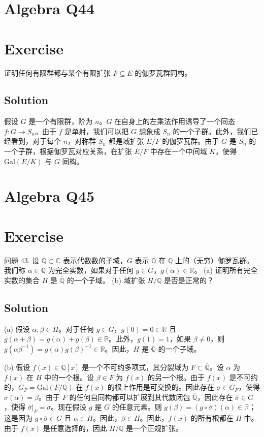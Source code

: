\documentclass[12pt]{book}
\begin{document}
\section{Algebra Q44}
\section*{Exercise}
证明任何有限群都与某个有限扩张 $F \subseteq E$ 的伽罗瓦群同构。



\subsection*{Solution}
假设 $G$ 是一个有限群，阶为 $n$。$G$ 在自身上的左乘法作用诱导了一个同态 $f: G \to S_n$。由于 $f$ 是单射，我们可以把 $G$ 想象成 $S_n$ 的一个子群。此外，我们已经看到，对于每个 $n$，对称群 $S_n$ 都是域扩张 $E/F$ 的伽罗瓦群。由于 $G$ 是 $S_n$ 的一个子群，根据伽罗瓦对应关系，在扩张 $E/F$ 中存在一个中间域 $K$，使得 $\text{Gal}(E/K)$ 与 $G$ 同构。
\newpage
\section{Algebra Q45}
\section*{Exercise}
问题 43. 设 $\overline{\mathbb{Q}} \subset \mathbb{C}$ 表示代数数的子域，$G$ 表示 $\overline{\mathbb{Q}}$ 在 $\mathbb{Q}$ 上的（无穷）伽罗瓦群。我们称 $\alpha \in \overline{\mathbb{Q}}$ 为完全实数，如果对于任何 $g \in G$，$g(\alpha) \in \mathbb{R}$。
(a) 证明所有完全实数的集合 $H$ 是 $\overline{\mathbb{Q}}$ 的一个子域。
(b) 域扩张 $H/\mathbb{Q}$ 是否是正常的？



\subsection*{Solution}
(a) 假设 $\alpha, \beta \in H$。对于任何 $g \in G$，$g(0) = 0 \in \mathbb{R}$ 且 $g(\alpha + \beta) = g(\alpha) + g(\beta) \in \mathbb{R}$。此外，$g(1) = 1$，如果 $\beta \neq 0$，则 $g(\alpha\beta^{-1}) = g(\alpha)g(\beta)^{-1} \in \mathbb{R}$。因此，$H$ 是 $\overline{\mathbb{Q}}$ 的一个子域。

(b) 假设 $f(x) \in \mathbb{Q}[x]$ 是一个不可约多项式，其分裂域为 $F \subset \overline{\mathbb{Q}}$。设 $\alpha$ 为 $f(x)$ 在 $H$ 中的一个根。设 $\beta \in F$ 为 $f(x)$ 的另一个根。由于 $f(x)$ 是不可约的，$G_F = \text{Gal}(F/\mathbb{Q})$ 在 $f(x)$ 的根上作用是可交换的。因此存在 $\sigma \in G_F$，使得 $\sigma(\alpha) = \beta$。由于 $F$ 的任何自同构都可以扩展到其代数闭包 $\overline{\mathbb{Q}}$，因此存在 $\overline{\sigma} \in G$，使得 $\overline{\sigma}|_F = \sigma$。现在假设 $g$ 是 $G$ 的任意元素。则 $g(\beta) = (g \circ \overline{\sigma})(\alpha) \in \mathbb{R}$；这是因为 $g \circ \overline{\sigma} \in G$ 且 $\alpha \in H$。因此，$\beta \in H$。因此，$f(x)$ 的所有根都在 $H$ 中。由于 $f(x)$ 是任意选择的，因此 $H/\mathbb{Q}$ 是一个正规扩张。
\newpage
\end{document}
